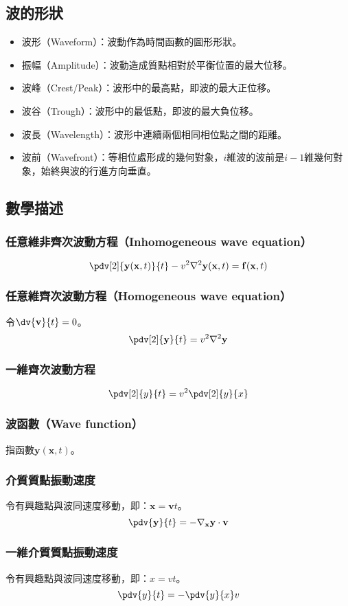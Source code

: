\documentclass[a4paper,12pt]{report}
\begin{document}
\subsection{波的形狀}
\begin{itemize}
\item 波形（Waveform）：波動作為時間函數的圖形形狀。
\item 振幅（Amplitude）：波動造成質點相對於平衡位置的最大位移。
\item 波峰（Crest/Peak）：波形中的最高點，即波的最大正位移。
\item 波谷（Trough）：波形中的最低點，即波的最大負位移。
\item 波長（Wavelength）：波形中連續兩個相同相位點之間的距離。
\item 波前（Wavefront）：等相位處形成的幾何對象，$i$維波的波前是$i-1$維幾何對象，始終與波的行進方向垂直。
\end{itemize}
\subsection{數學描述}
\subsubsection{任意維非齊次波動方程（Inhomogeneous wave equation）}
\[\pdv[2]{\mathbf{y}(\mathbf{x},t)}{t}-v^2\nabla^2\mathbf{y}(\mathbf{x},t)=\mathbf{f}(\mathbf{x},t)\]
\subsubsection{任意維齊次波動方程（Homogeneous wave equation）}
令$\dv{\mathbf{v}}{t}=0$。
\[\pdv[2]{\mathbf{y}}{t}=v^2\nabla^2\mathbf{y}\]
\subsubsection{一維齊次波動方程}
\[\pdv[2]{y}{t}=v^2\pdv[2]{y}{x}\]
\subsubsection{波函數（Wave function）}
指函數\(\mathbf{y}(\mathbf{x},t)\)。
\subsubsection{介質質點振動速度}
令有興趣點與波同速度移動，即：$\mathbf{x}=\mathbf{v}t$。
\[\pdv{\mathbf{y}}{t} = - \nabla_{\mathbf{x}} \mathbf{y} \cdot \mathbf{v}\]
\subsubsection{一維介質質點振動速度}
令有興趣點與波同速度移動，即：$x=vt$。
\[ \pdv{y}{t}=-\pdv{y}{x}v \]
\end{document}
